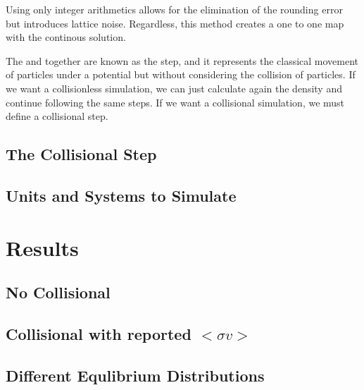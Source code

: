 Using only integer arithmetics allows for the elimination of the rounding error but introduces lattice noise. Regardless, this method creates a one to one map with the continous solution.\cite{franco} \cite{integerLatticeDynamics}

The  and  together are known as the  step, and it represents the classical movement of particles under a potential but without considering the collision of particles. If we want a collisionless simulation, we can just calculate again the density and continue following the same steps. If we want a collisional simulation, we must define a collisional step.

\section{The Collisional Step}


\section{Units and Systems to Simulate}




















\chapter{Results}
\section{No Collisional}
\section{Collisional with reported $<\sigma v>$}
\section{Different Equlibrium Distributions}